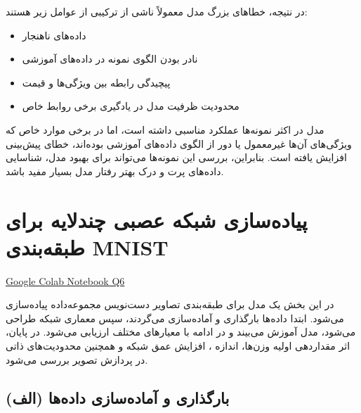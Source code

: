 \documentclass[12pt,a4paper]{article}
\begin{document}
در نتیجه، خطاهای بزرگ مدل معمولاً ناشی از ترکیبی از عوامل زیر هستند:
\begin{itemize}
	\item داده‌های ناهنجار
	\item نادر بودن الگوی نمونه در داده‌های آموزشی
	\item پیچیدگی رابطه بین ویژگی‌ها و قیمت
	\item محدودیت ظرفیت مدل در یادگیری برخی روابط خاص
\end{itemize}

\begin{tcolorbox}[colback=red!5!white, colframe=red!60!black, title=جمع‌بندی]
	مدل در اکثر نمونه‌ها عملکرد مناسبی داشته است، اما در برخی موارد خاص که ویژگی‌های آن‌ها غیرمعمول یا دور از الگوی داده‌های آموزشی بوده‌اند، خطای پیش‌بینی افزایش یافته است.  
	بنابراین، بررسی این نمونه‌ها می‌تواند برای بهبود مدل، شناسایی داده‌های پرت و درک بهتر رفتار مدل بسیار مفید باشد.
\end{tcolorbox}
	


\section{پیاده‌سازی شبکه عصبی چندلایه برای طبقه‌بندی MNIST}
\href{https://colab.research.google.com/drive/16Oj5WrMHQ8iTJZ-1LYvhNW6yJ8TLnpqI?usp=sharing}{Google Colab Notebook Q6}
\begin{tcolorbox}[
	colback=lightblue,
	colframe=mainblue,
	title=ایده کلی پروژه,
	coltitle=black,
	fonttitle=\bfseries
	]
	در این بخش یک مدل  برای طبقه‌بندی تصاویر دست‌نویس مجموعه‌داده  پیاده‌سازی می‌شود. ابتدا داده‌ها بارگذاری و آماده‌سازی می‌گردند، سپس معماری شبکه طراحی می‌شود، مدل آموزش می‌بیند و در ادامه با معیارهای مختلف ارزیابی می‌شود. در پایان، اثر مقداردهی اولیه وزن‌ها، اندازه ، افزایش عمق شبکه و همچنین محدودیت‌های ذاتی  در پردازش تصویر بررسی می‌شود.
\end{tcolorbox}


\subsection{(الف) بارگذاری و آماده‌سازی داده‌ها}
\end{document}

